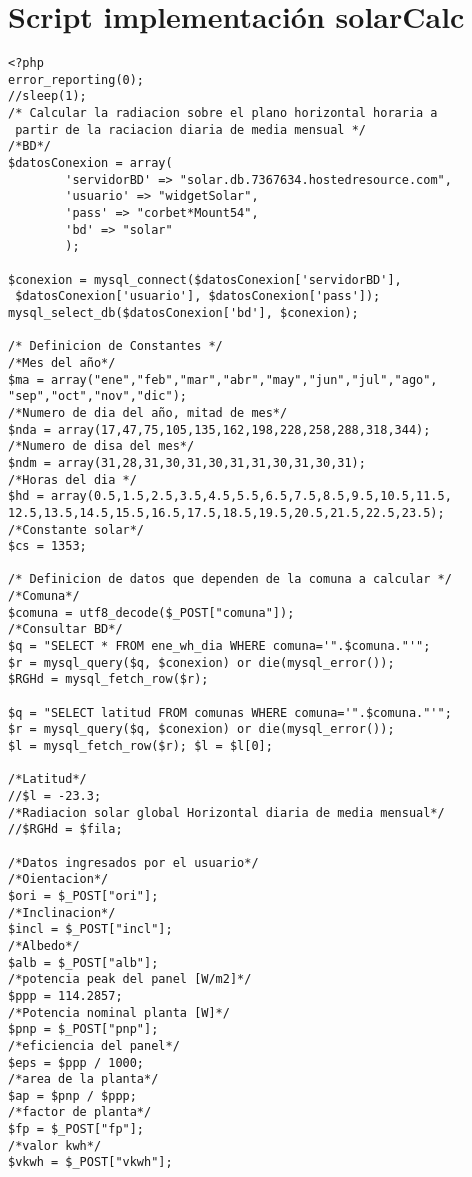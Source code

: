 \section{Script implementación solarCalc}
\label{phpCalculadora}
\begin{verbatim}
<?php
error_reporting(0);
//sleep(1);
/* Calcular la radiacion sobre el plano horizontal horaria a
 partir de la raciacion diaria de media mensual */
/*BD*/
$datosConexion = array(
        'servidorBD' => "solar.db.7367634.hostedresource.com",
        'usuario' => "widgetSolar",
        'pass' => "corbet*Mount54",
        'bd' => "solar"
        );

$conexion = mysql_connect($datosConexion['servidorBD'],
 $datosConexion['usuario'], $datosConexion['pass']);
mysql_select_db($datosConexion['bd'], $conexion);

/* Definicion de Constantes */
/*Mes del año*/
$ma = array("ene","feb","mar","abr","may","jun","jul","ago",
"sep","oct","nov","dic");
/*Numero de dia del año, mitad de mes*/
$nda = array(17,47,75,105,135,162,198,228,258,288,318,344);
/*Numero de disa del mes*/
$ndm = array(31,28,31,30,31,30,31,31,30,31,30,31);
/*Horas del dia */
$hd = array(0.5,1.5,2.5,3.5,4.5,5.5,6.5,7.5,8.5,9.5,10.5,11.5,
12.5,13.5,14.5,15.5,16.5,17.5,18.5,19.5,20.5,21.5,22.5,23.5);
/*Constante solar*/
$cs = 1353;

/* Definicion de datos que dependen de la comuna a calcular */
/*Comuna*/
$comuna = utf8_decode($_POST["comuna"]);
/*Consultar BD*/
$q = "SELECT * FROM ene_wh_dia WHERE comuna='".$comuna."'";
$r = mysql_query($q, $conexion) or die(mysql_error());
$RGHd = mysql_fetch_row($r);

$q = "SELECT latitud FROM comunas WHERE comuna='".$comuna."'";
$r = mysql_query($q, $conexion) or die(mysql_error());
$l = mysql_fetch_row($r); $l = $l[0];
 
/*Latitud*/
//$l = -23.3;
/*Radiacion solar global Horizontal diaria de media mensual*/
//$RGHd = $fila;

/*Datos ingresados por el usuario*/
/*Oientacion*/
$ori = $_POST["ori"];
/*Inclinacion*/
$incl = $_POST["incl"];
/*Albedo*/
$alb = $_POST["alb"];
/*potencia peak del panel [W/m2]*/
$ppp = 114.2857;
/*Potencia nominal planta [W]*/
$pnp = $_POST["pnp"];
/*eficiencia del panel*/
$eps = $ppp / 1000;
/*area de la planta*/
$ap = $pnp / $ppp;
/*factor de planta*/
$fp = $_POST["fp"];
/*valor kwh*/
$vkwh = $_POST["vkwh"];


\end{verbatim}
